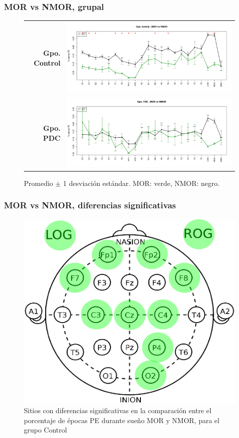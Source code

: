 \documentclass{beamer}
\begin{document}

\begin{frame}\frametitle{MOR vs NMOR, grupal}
\begin{figure}
\centering
\begin{tabular}{rl}
{\Large \textbf{Gpo. Control}}
&
\includegraphics[width=0.6\linewidth]
{./img_ejemplos/comp_etapas_gpos_NORMALMOR_vs_NMOR.pdf} 
\\
{\Large \textbf{Gpo. PDC}}
&
\includegraphics[width=0.6\linewidth]
{./img_ejemplos/comp_etapas_gpos_PDCMOR_vs_NMOR.pdf} 
\end{tabular}
\caption{ Promedio $\pm$ 1 desviaci\'on est\'andar. MOR: verde, NMOR: negro.}
\end{figure}
\end{frame}


\begin{frame}\frametitle{MOR vs NMOR, diferencias significativas}
\begin{figure}
\centering
\includegraphics[width=0.4\linewidth]
{./img_diagramas/cabecita.pdf} 
\caption{Sitios con diferencias 
significativas en la comparaci\'on entre el porcentaje de \'epocas PE durante sue\~no MOR y NMOR, 
para el grupo Control}
\end{figure}
\end{frame}
\end{document}
